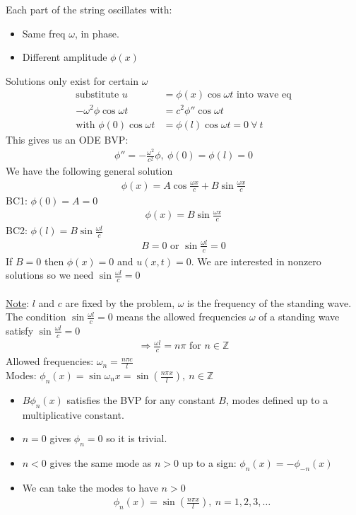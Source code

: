 \documentclass[12pt, letterpaper]{article}
\begin{document}
Each part of the string oscillates with:
\begin{itemize}
    \item Same freq $\omega$, in phase.
    \item Different amplitude $\phi(x)$
\end{itemize}
Solutions only exist for certain $\omega$
\begin{align*}
    \text{substitute } u &= \phi(x) \cos\omega t \text{ into wave eq} \\
    - \omega^2 \phi \cos \omega t &= c^2 \phi'' \cos\omega t \\
    \text{with } \phi(0)\cos\omega t &= \phi(l) \cos \omega t = 0\ \forall \ t
\end{align*}
This gives us an ODE BVP:
\begin{align*}
    \phi '' = -\frac{\omega^2}{c^2} \phi,\ \phi(0) = \phi(l)= 0
\end{align*}
We have the following general solution
\begin{align*}
    \phi(x) = A\cos\frac{\omega x}{c} + B\sin\frac{\omega x}{c}
\end{align*}
BC1: $\phi(0) = A = 0$ 
\begin{align*}
    \phi(x) = B \sin \frac{\omega x}{c}
\end{align*}
BC2: $\phi(l) = B \sin \frac{\omega l }{c}$
\begin{align*}
    B = 0 \text{ or } \sin\frac{\omega l}{c} = 0
\end{align*}
If $B = 0$ then $\phi(x) = 0$ and $u(x,t) = 0$. We are interested in nonzero 
solutions so we need $\sin \frac{\omega l}{c} = 0$ \\ \\
\underline{Note}: $l$ and $c$ are fixed by the problem, $\omega$ is the 
frequency of the standing wave. The condition $\sin \frac{\omega l}{c} = 0$
means the allowed frequencies $\omega$ of a standing wave satisfy 
$\sin\frac{\omega l}{c} = 0$
\begin{align*}
    \Rightarrow \frac{\omega l}{c} = n\pi \text{ for } n \in \mathbb{Z}
\end{align*}
Allowed frequencies: $\omega_n = \frac{n\pi c}{l}$ \\
Modes: $\phi_n(x) = \sin\omega_n x = \sin \left(\frac{n\pi x}{l}\right),\ n \in \mathbb{Z}$
\begin{itemize}
    \item $B\phi_n(x)$ satisfies the BVP for any constant $B$, modes defined
    up to a multiplicative constant.
    \item $n=0$ gives $\phi_n = 0$ so it is trivial.
    \item $n<0$ gives the same mode as $n>0$ up to a sign: $\phi_n(x) = - \phi_{-n}(x)$
    \item We can take the modes to have $n>0$
    \begin{align*}
        \phi_n(x) = \sin\left(\frac{n\pi x}{l}\right),\ n = 1,2,3,\dots
    \end{align*}
\end{itemize}
\end{document}

